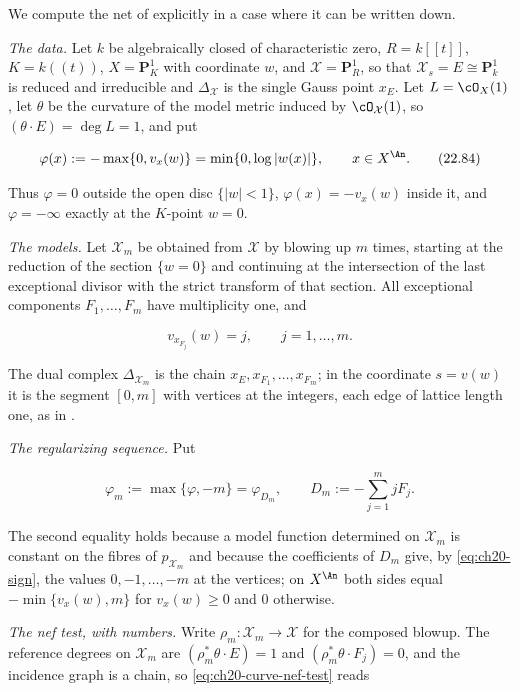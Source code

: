 \begin{example}
\label{ex:ch22-regularization-curve}
We compute the net of  explicitly in
a case where it can be written down.

\emph{The data.}  Let $k$ be algebraically closed of characteristic zero,
$R=k[[t]]$, $K=k((t))$, $X=\mathbf P^1_K$ with coordinate $w$, and
$\mathcal X=\mathbf P^1_R$, so that $\mathcal X_s=E\cong\mathbf P^1_k$ is
reduced and irreducible and $\Delta_{\mathcal X}$ is the single Gauss point
$x_E$.  Let $L=\cO_X(1)$, let $\theta$ be the curvature of the model
metric induced by $\cO_{\mathcal X}(1)$, so $(\theta\cdot E)=\deg L=1$,
and put

\[
 \varphi(x):=-\max\{0,v_x(w)\}
 =\min\{0,\log|w(x)|\},
 \qquad x\in X^{\An}.
\tag{22.84}\label{eq:ch22-green-function}
\]

Thus $\varphi=0$ outside the open disc $\{|w|<1\}$, $\varphi(x)=-v_x(w)$
inside it, and $\varphi=-\infty$ exactly at the $K$-point $w=0$.

\emph{The models.}  Let $\mathcal X_m$ be obtained from $\mathcal X$ by
blowing up $m$ times, starting at the reduction of the section
$\{w=0\}$ and continuing at the intersection of the last exceptional
divisor with the strict transform of that section.  All exceptional
components $F_1,\ldots,F_m$ have multiplicity one, and

\[
 v_{x_{F_j}}(w)=j,\qquad j=1,\ldots,m .
\]

The dual complex $\Delta_{\mathcal X_m}$ is the chain
$x_E,x_{F_1},\ldots,x_{F_m}$; in the coordinate $s=v(w)$ it is the
segment $[0,m]$ with vertices at the integers, each edge of lattice length
one, as in .

\emph{The regularizing sequence.}  Put

\[
 \varphi_m:=\max\{\varphi,-m\}
 =\varphi_{D_m},
 \qquad
 D_m:=-\sum_{j=1}^{m}jF_j .
\tag{22.85}\label{eq:ch22-truncated-green}
\]

The second equality holds because a model function determined on
$\mathcal X_m$ is constant on the fibres of $p_{\mathcal X_m}$ and
because the coefficients of $D_m$ give, by
\eqref{eq:ch20-sign}, the values $0,-1,\ldots,-m$ at the vertices; on
$X^{\An}$ both sides equal $-\min\{v_x(w),m\}$ for
$v_x(w)\geq0$ and $0$ otherwise.

\emph{The nef test, with numbers.}  Write $\rho_m:\mathcal X_m\to\mathcal X$
for the composed blowup.  The reference degrees on
$\mathcal X_m$ are $(\rho_m^*\theta\cdot E)=1$ and
$(\rho_m^*\theta\cdot F_j)=0$, and the incidence graph is a chain, so
\eqref{eq:ch20-curve-nef-test} reads


\end{example}
